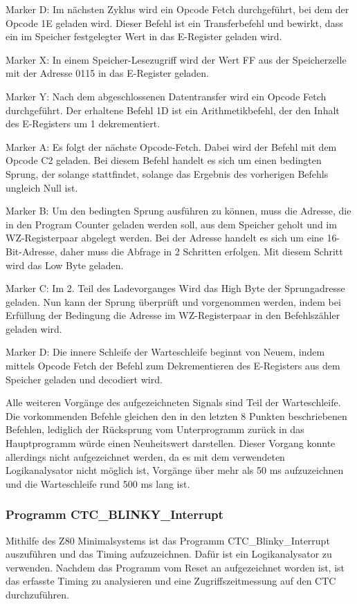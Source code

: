 Marker D: Im nächsten Zyklus wird ein Opcode Fetch durchgeführt, bei dem der Opcode 1E geladen wird. Dieser Befehl ist ein Transferbefehl und bewirkt, dass ein im Speicher festgelegter Wert in das E-Register geladen wird.

Marker X: In einem Speicher-Lesezugriff wird der Wert FF aus der Speicherzelle mit der Adresse 0115 in das E-Register geladen.

Marker Y: Nach dem abgeschlossenen Datentransfer wird ein Opcode Fetch durchgeführt. Der erhaltene Befehl 1D ist ein Arithmetikbefehl, der den Inhalt des E-Registers um 1 dekrementiert.

Marker A: Es folgt der nächste Opcode-Fetch. Dabei wird der Befehl mit dem Opcode C2 geladen. Bei diesem Befehl handelt es sich um einen bedingten Sprung, der solange stattfindet, solange das Ergebnis des vorherigen Befehls ungleich Null ist.

Marker B: Um den bedingten Sprung ausführen zu können, muss die Adresse, die in den Program Counter geladen werden soll, aus dem Speicher geholt und im WZ-Registerpaar abgelegt werden. Bei der Adresse handelt es sich um eine 16-Bit-Adresse, daher muss die Abfrage in 2 Schritten erfolgen. Mit diesem Schritt wird das Low Byte geladen.

Marker C: Im 2. Teil des Ladevorganges Wird das High Byte der Sprungadresse geladen. Nun kann der Sprung überprüft und vorgenommen werden, indem bei Erfüllung der Bedingung die Adresse im WZ-Registerpaar in den Befehlszähler geladen wird.

Marker D: Die innere Schleife der Warteschleife beginnt von Neuem, indem mittels Opcode Fetch der Befehl zum Dekrementieren des E-Registers aus dem Speicher geladen und decodiert wird.

Alle weiteren Vorgänge des aufgezeichneten Signals sind Teil der Warteschleife. Die vorkommenden Befehle gleichen den in den letzten 8 Punkten beschriebenen Befehlen, lediglich der Rücksprung vom Unterprogramm zurück in das Hauptprogramm würde einen Neuheitswert darstellen. Dieser Vorgang konnte allerdings nicht aufgezeichnet werden, da es mit dem verwendeten Logikanalysator nicht möglich ist, Vorgänge über mehr als 50 ms aufzuzeichnen und die Warteschleife rund 500 ms lang ist.

\subsubsection{Programm CTC\_BLINKY\_Interrupt}
Mithilfe des Z80 Minimalsystems ist das Programm CTC\_Blinky\_Interrupt auszuführen und das Timing aufzuzeichnen. Dafür ist ein Logikanalysator zu verwenden. Nachdem das Programm vom Reset an aufgezeichnet worden ist, ist das erfasste Timing zu analysieren und eine Zugriffszeitmessung auf den CTC durchzuführen.

